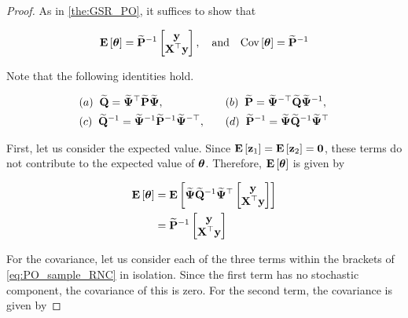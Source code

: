 \begin{proof}
As in \cref{the:GSR_PO}, it suffices to show that

$$
\mathbf{E}\left[\boldsymbol{\theta}\right] = \widetilde{\mathbf{P}}^{-1} \begin{bmatrix} \mathbf{y} \\ \mathbf{X}^\top \mathbf{y} \end{bmatrix}, \quad \text{and} \quad \text{Cov}\left[\boldsymbol{\theta}  \right] = \widetilde{\mathbf{P}}^{-1} 
$$

Note that the following identities hold. 

    \begin{align*}
        &(a) \;\; \widetilde{\mathbf{Q}} = \widetilde{\mathbf{\Psi}}^\top \widetilde{\mathbf{P}} \widetilde{\mathbf{\Psi}}, \quad &&(b) \;\; \widetilde{\mathbf{P}} = \widetilde{\mathbf{\Psi}}^{-\top} \widetilde{\mathbf{Q}} \widetilde{\mathbf{\Psi}}^{-1}, \\
        &(c) \;\; \widetilde{\mathbf{Q}}^{-1} = \widetilde{\mathbf{\Psi}}^{-1} \widetilde{\mathbf{P}}^{-1} \widetilde{\mathbf{\Psi}}^{-\top}, \quad &&(d) \;\; \widetilde{\mathbf{P}}^{-1} = \widetilde{\mathbf{\Psi}} \widetilde{\mathbf{Q}}^{-1} \widetilde{\mathbf{\Psi}}^\top
    \end{align*}

First, let us consider the expected value. Since $\mathbf{E}\left[\mathbf{z}_1\right] = \mathbf{E}\left[\mathbf{z}_2\right] = \mathbf{0}$, these terms do not contribute to the expected value of $\boldsymbol{\theta}$. Therefore, $\mathbf{E}\left[\boldsymbol{\theta}\right]$ is given by 

\begin{align*}
    \mathbf{E}\left[\boldsymbol{\theta}\right] &= \mathbf{E}\left[\widetilde{\mathbf{\Psi}} \widetilde{\mathbf{Q}}^{-1} \widetilde{\mathbf{\Psi}}^\top \begin{bmatrix} \mathbf{y} \\ \mathbf{X}^\top \mathbf{y} \end{bmatrix}\right] \\
    &= \widetilde{\mathbf{P}}^{-1} \begin{bmatrix} \mathbf{y} \\ \mathbf{X}^\top \mathbf{y} \end{bmatrix} 
\end{align*}

For the covariance, let us consider each of the three terms within the brackets of \cref{eq:PO_sample_RNC} in isolation. Since the first term has no stochastic component, the covariance of this is zero. For the second term, the covariance is given by 


\end{proof}
